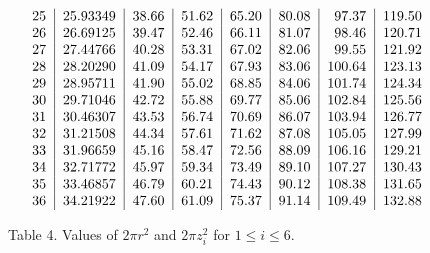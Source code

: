 $$\begin{tabular}{c|r|r|r|r|r|r|r}
25 & 25.93349 & 38.66 & 51.62 & 65.20 & 80.08 & 97.37 & 119.50\\
26 & 26.69125 & 39.47 & 52.46 & 66.11 & 81.07 & 98.46 & 120.71\\
27 & 27.44766 & 40.28 & 53.31 & 67.02 & 82.06 & 99.55 & 121.92\\
28 & 28.20290 & 41.09 & 54.17 & 67.93 & 83.06 & 100.64 & 123.13\\
29 & 28.95711 & 41.90 & 55.02 & 68.85 & 84.06 & 101.74 & 124.34\\
30 & 29.71046 & 42.72 & 55.88 & 69.77 & 85.06 & 102.84 & 125.56\\
31 & 30.46307 & 43.53 & 56.74 & 70.69 & 86.07 & 103.94 & 126.77\\
32 & 31.21508 & 44.34 & 57.61 & 71.62 & 87.08 & 105.05 & 127.99\\
33 & 31.96659 & 45.16 & 58.47 & 72.56 & 88.09 & 106.16 & 129.21\\
34 & 32.71772 & 45.97 & 59.34 & 73.49 & 89.10 & 107.27 & 130.43\\
35 & 33.46857 & 46.79 & 60.21 & 74.43 & 90.12 & 108.38 & 131.65\\
36 & 34.21922 & 47.60 & 61.09 & 75.37 & 91.14 & 109.49 & 132.88\\
\end{tabular}
\begin{tabular}{c}\kern4in\end{tabular}
$$
\centerline{Table 4. Values of $2\pi r^2$ and $2\pi z_i^2$ for $1 \le i \le 6$.}

